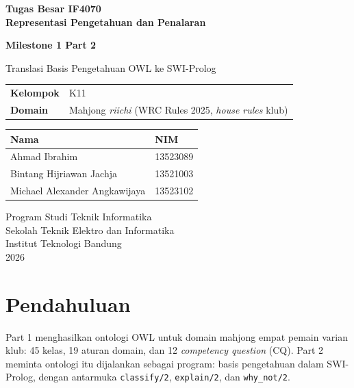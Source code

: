 \documentclass[11pt,a4paper]{article}
\newcommand{\code}[1]{\texttt{#1}}
\newcommand{\grup}{K11}
\begin{document}
\begin{titlepage}
\centering
\vspace*{2cm}
{\Large\bfseries Tugas Besar IF4070\\ Representasi Pengetahuan dan Penalaran\par}
\vspace{1.2cm}
{\LARGE\bfseries Milestone 1 Part 2\par}
\vspace{0.4cm}
{\large Translasi Basis Pengetahuan OWL ke SWI-Prolog\par}
\vspace{2cm}

\begin{tabular}{ll}
\toprule
\textbf{Kelompok} & \grup \\
\textbf{Domain}   & Mahjong \emph{riichi} (WRC Rules 2025, \emph{house rules} klub) \\
\bottomrule
\end{tabular}

\vspace{1.5cm}
\begin{tabular}{ll}
\toprule
\textbf{Nama} & \textbf{NIM} \\
\midrule
Ahmad Ibrahim & 13523089 \\
Bintang Hijriawan Jachja & 13521003 \\
Michael Alexander Angkawijaya & 13523102 \\
\bottomrule
\end{tabular}

\vfill
{\small Program Studi Teknik Informatika\\
Sekolah Teknik Elektro dan Informatika\\
Institut Teknologi Bandung\\[4pt]
2026\par}
\end{titlepage}

\section{Pendahuluan}

Part 1 menghasilkan ontologi OWL untuk domain mahjong empat pemain varian klub:
45 kelas, 19 aturan domain, dan 12 \textit{competency question} (CQ). Part 2 meminta
ontologi itu dijalankan sebagai program: basis pengetahuan dalam SWI-Prolog, dengan
antarmuka \code{classify/2}, \code{explain/2}, dan \code{why_not/2}.
\end{document}
